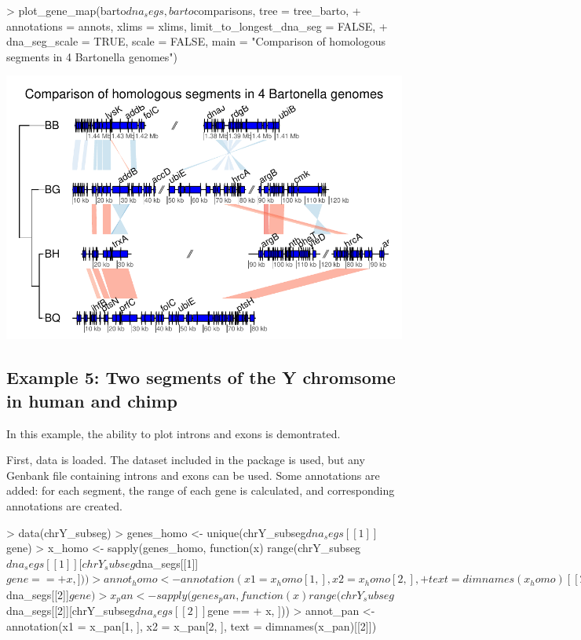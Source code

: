 \documentclass[a4paper]{article}
\begin{document}
\begin{Schunk}
\begin{Sinput}
> plot_gene_map(barto$dna_segs, barto$comparisons, tree = tree_barto, 
+     annotations = annots, xlims = xlims, limit_to_longest_dna_seg = FALSE, 
+     dna_seg_scale = TRUE, scale = FALSE, main = "Comparison of homologous segments in 4 Bartonella genomes")
\end{Sinput}
\end{Schunk}
\begin{center}
\includegraphics{genoPlotR-034}
\end{center}

\subsection{Example 5: Two segments of the Y chromsome in human and chimp}

In this example, the ability to plot introns and exons is demontrated.

First, data is loaded. The dataset included in the package is used, but any
Genbank file containing introns and exons can be used. Some annotations are
added: for each segment, the range of each gene is calculated, and 
corresponding annotations are created. 

\begin{Schunk}
\begin{Sinput}
> data(chrY_subseg)
> genes_homo <- unique(chrY_subseg$dna_segs[[1]]$gene)
> x_homo <- sapply(genes_homo, function(x) range(chrY_subseg$dna_segs[[1]][chrY_subseg$dna_segs[[1]]$gene == 
+     x, ]))
> annot_homo <- annotation(x1 = x_homo[1, ], x2 = x_homo[2, ], 
+     text = dimnames(x_homo)[[2]])
> genes_pan <- unique(chrY_subseg$dna_segs[[2]]$gene)
> x_pan <- sapply(genes_pan, function(x) range(chrY_subseg$dna_segs[[2]][chrY_subseg$dna_segs[[2]]$gene == 
+     x, ]))
> annot_pan <- annotation(x1 = x_pan[1, ], x2 = x_pan[2, ], text = dimnames(x_pan)[[2]])
\end{Sinput}
\end{Schunk}
\end{document}
